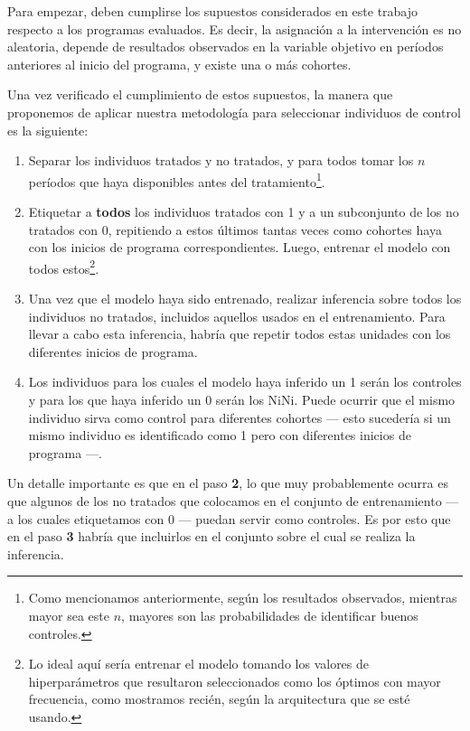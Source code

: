 \documentclass[../main.tex]{subfiles}
\begin{document}
Para empezar, deben cumplirse los supuestos considerados en este trabajo respecto a los
programas evaluados. Es decir, la asignación a la intervención es no aleatoria, depende de
resultados observados en la variable objetivo en períodos anteriores al inicio del
programa, y existe una o más cohortes.

Una vez verificado el cumplimiento de estos supuestos, la manera que proponemos de aplicar
nuestra metodología para seleccionar individuos de control es la siguiente:
\begin{enumerate}[itemsep=0.1cm, label=\textbf{\arabic*.}]
    \item Separar los individuos tratados y no tratados, y para todos tomar los \(n\)
    períodos que haya disponibles antes del tratamiento\footnote{Como mencionamos
    anteriormente, según los resultados observados, mientras mayor sea este \(n\), mayores
    son las probabilidades de identificar buenos controles.}.
    \item Etiquetar a \textbf{todos} los individuos tratados con 1 y a un subconjunto de
    los no tratados con 0, repitiendo a estos últimos tantas veces como cohortes haya con
    los inicios de programa correspondientes. Luego, entrenar el modelo con todos
    estos\footnote{Lo ideal aquí sería entrenar el modelo tomando los valores de
    hiperparámetros que resultaron seleccionados como los óptimos con mayor frecuencia,
    como mostramos recién, según la arquitectura que se esté usando.}.
    \item Una vez que el modelo haya sido entrenado, realizar inferencia sobre todos los
    individuos no tratados, incluidos aquellos usados en el entrenamiento. Para llevar a
    cabo esta inferencia, habría que repetir todos estas unidades con los diferentes
    inicios de programa.
    \item Los individuos para los cuales el modelo haya inferido un 1 serán los controles
    y para los que haya inferido un 0 serán los NiNi. Puede ocurrir que el mismo individuo
    sirva como control para diferentes cohortes — esto sucedería si un mismo individuo es
    identificado como 1 pero con diferentes inicios de programa —.
\end{enumerate}

Un detalle importante es que en el paso \textbf{2}, lo que muy probablemente ocurra es que
algunos de los no tratados que colocamos en el conjunto de entrenamiento — a los cuales
etiquetamos con 0 — puedan servir como controles. Es por esto que en el paso \textbf{3}
habría que incluirlos en el conjunto sobre el cual se realiza la inferencia.
\end{document}
